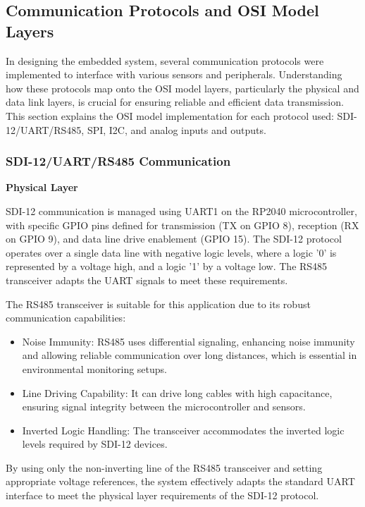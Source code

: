 \subsection{Communication Protocols and OSI Model Layers}

In designing the embedded system, several communication protocols were implemented 
to interface with various sensors and peripherals. Understanding how these protocols 
map onto the OSI model layers, particularly the physical and data link layers, is 
crucial for ensuring reliable and efficient data transmission. This section explains 
the OSI model implementation for each protocol used: SDI-12/UART/RS485, SPI, I2C, 
and analog inputs and outputs.

\subsubsection{SDI-12/UART/RS485 Communication}

\textbf{Physical Layer}

SDI-12 communication is managed using UART1 on the RP2040 microcontroller, with specific 
GPIO pins defined for transmission (TX on GPIO 8), reception (RX on GPIO 9), and data 
line drive enablement (GPIO 15). The SDI-12 protocol operates over a single data line 
with negative logic levels, where a logic '0' is represented by a voltage high, and a 
logic '1' by a voltage low. The RS485 transceiver adapts the UART signals to meet these requirements.

The RS485 transceiver is suitable for this application due to its robust communication capabilities:

\begin{itemize}
    \item Noise Immunity: RS485 uses differential signaling, enhancing noise immunity and allowing 
    reliable communication over long distances, which is essential in environmental monitoring setups.
    \item Line Driving Capability: It can drive long cables with high capacitance, ensuring signal 
    integrity between the microcontroller and sensors.
    \item Inverted Logic Handling: The transceiver accommodates the inverted logic levels required by SDI-12 devices.
\end{itemize}

By using only the non-inverting line of the RS485 transceiver and setting appropriate voltage references, 
the system effectively adapts the standard UART interface to meet the physical layer requirements of the SDI-12 protocol.

